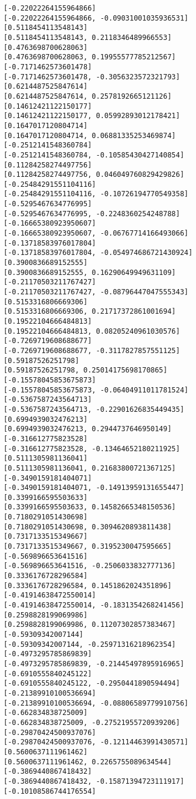 \documentclass[11pt]{article}
\begin{document}
\begin{Verbatim}[commandchars=\\\{\}]
[-0.22022264155964866]
[-0.22022264155964866, -0.09031001035936531]
[0.5118454113548143]
[0.5118454113548143, 0.2118346489966553]
[0.4763698700628063]
[0.4763698700628063, 0.19955577785212567]
[-0.7171462573601478]
[-0.7171462573601478, -0.3056323572321793]
[0.6214487525847614]
[0.6214487525847614, 0.2578192665121126]
[0.14612421122150177]
[0.14612421122150177, 0.05992893012178421]
[0.1647017120804714]
[0.1647017120804714, 0.06881335253469874]
[-0.2512141548360784]
[-0.2512141548360784, -0.10585430427140854]
[0.11284258274497756]
[0.11284258274497756, 0.046049760829429826]
[-0.25484291551104116]
[-0.25484291551104116, -0.10726194770549358]
[-0.5295467634776995]
[-0.5295467634776995, -0.2248360254248788]
[-0.16665380923950607]
[-0.16665380923950607, -0.06767714166493066]
[-0.13718583976017804]
[-0.13718583976017804, -0.054974686721430924]
[0.3900836689152555]
[0.3900836689152555, 0.16290649949631109]
[-0.21170503211767427]
[-0.21170503211767427, -0.08796447047555343]
[0.5153316806669306]
[0.5153316806669306, 0.21717372861001694]
[0.19522104666484813]
[0.19522104666484813, 0.08205240961030576]
[-0.7269719608688677]
[-0.7269719608688677, -0.3117827857551125]
[0.59187526251798]
[0.59187526251798, 0.25014175698170865]
[-0.15578045853675873]
[-0.15578045853675873, -0.06404911011781524]
[-0.5367587243564713]
[-0.5367587243564713, -0.22901626835449435]
[0.6994939032476213]
[0.6994939032476213, 0.2944737646950149]
[-0.316612775823528]
[-0.316612775823528, -0.13464652180211925]
[0.5111305981136041]
[0.5111305981136041, 0.21683800721367125]
[-0.3490159181404071]
[-0.3490159181404071, -0.14913959131655447]
[0.3399166595503633]
[0.3399166595503633, 0.14582665348150536]
[0.7180291051430698]
[0.7180291051430698, 0.3094620893811438]
[0.7317133515349667]
[0.7317133515349667, 0.3195230047595665]
[-0.569896653641516]
[-0.569896653641516, -0.2506033832777136]
[0.3336176728296584]
[0.3336176728296584, 0.1451862024351896]
[-0.41914638472550014]
[-0.41914638472550014, -0.1831354268241456]
[0.2598828199069986]
[0.2598828199069986, 0.11207302857383467]
[-0.59309342007144]
[-0.59309342007144, -0.25971316218962354]
[-0.4973295785869839]
[-0.4973295785869839, -0.21445497895916965]
[-0.6910555840245122]
[-0.6910555840245122, -0.2950441890594494]
[-0.21389910100536694]
[-0.21389910100536694, -0.08806589779910756]
[-0.662834838725009]
[-0.662834838725009, -0.27521955720939206]
[-0.29870424500937076]
[-0.29870424500937076, -0.12114463991430571]
[0.5600637111961462]
[0.5600637111961462, 0.2265755089634544]
[-0.3869440867418432]
[-0.3869440867418432, -0.15871394723111917]
[-0.10108586744176554]

\end{Verbatim}
\end{document}
